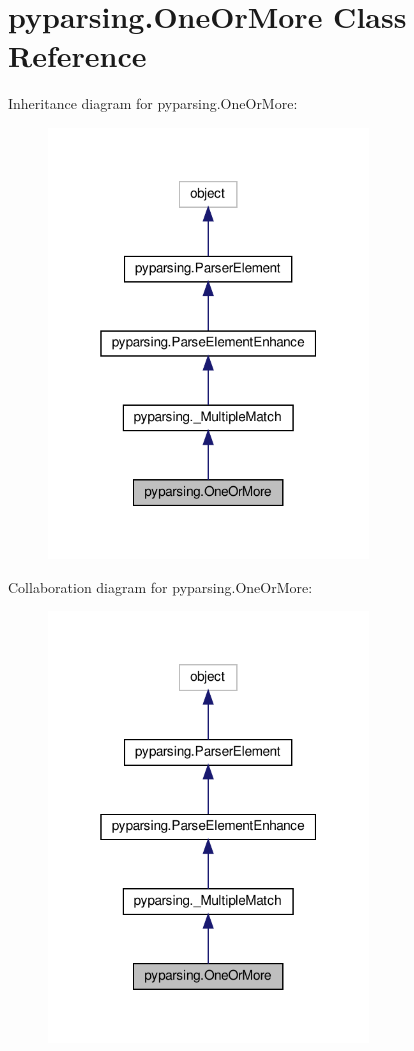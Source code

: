 \hypertarget{classpyparsing_1_1OneOrMore}{}\section{pyparsing.\+One\+Or\+More Class Reference}
\label{classpyparsing_1_1OneOrMore}


Inheritance diagram for pyparsing.\+One\+Or\+More\+:
\nopagebreak
\begin{figure}[H]
\begin{center}
\leavevmode
\includegraphics[width=241pt]{classpyparsing_1_1OneOrMore__inherit__graph}
\end{center}
\end{figure}


Collaboration diagram for pyparsing.\+One\+Or\+More\+:
\nopagebreak
\begin{figure}[H]
\begin{center}
\leavevmode
\includegraphics[width=241pt]{classpyparsing_1_1OneOrMore__coll__graph}
\end{center}
\end{figure}
